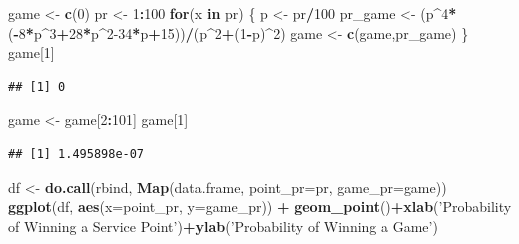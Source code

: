 \documentclass[]{article}
\newenvironment{Shaded}{\begin{snugshade}}{\end{snugshade}}
\newcommand{\ControlFlowTok}[1]{\textcolor[rgb]{0.13,0.29,0.53}{\textbf{#1}}}
\newcommand{\DataTypeTok}[1]{\textcolor[rgb]{0.13,0.29,0.53}{#1}}
\newcommand{\DecValTok}[1]{\textcolor[rgb]{0.00,0.00,0.81}{#1}}
\newcommand{\KeywordTok}[1]{\textcolor[rgb]{0.13,0.29,0.53}{\textbf{#1}}}
\newcommand{\NormalTok}[1]{#1}
\newcommand{\OperatorTok}[1]{\textcolor[rgb]{0.81,0.36,0.00}{\textbf{#1}}}
\newcommand{\StringTok}[1]{\textcolor[rgb]{0.31,0.60,0.02}{#1}}
\begin{document}
\begin{Shaded}
\begin{Highlighting}[]
\NormalTok{game <-}\StringTok{ }\KeywordTok{c}\NormalTok{(}\DecValTok{0}\NormalTok{)}
\NormalTok{pr <-}\StringTok{ }\DecValTok{1}\OperatorTok{:}\DecValTok{100}
\ControlFlowTok{for}\NormalTok{(x }\ControlFlowTok{in}\NormalTok{ pr) \{}
\NormalTok{  p <-}\StringTok{ }\NormalTok{pr}\OperatorTok{/}\DecValTok{100}
\NormalTok{  pr_game <-}\StringTok{ }\NormalTok{(p}\OperatorTok{^}\DecValTok{4}\OperatorTok{*}\NormalTok{(}\OperatorTok{-}\DecValTok{8}\OperatorTok{*}\NormalTok{p}\OperatorTok{^}\DecValTok{3}\OperatorTok{+}\DecValTok{28}\OperatorTok{*}\NormalTok{p}\OperatorTok{^}\DecValTok{2-34}\OperatorTok{*}\NormalTok{p}\OperatorTok{+}\DecValTok{15}\NormalTok{))}\OperatorTok{/}\NormalTok{(p}\OperatorTok{^}\DecValTok{2}\OperatorTok{+}\NormalTok{(}\DecValTok{1}\OperatorTok{-}\NormalTok{p)}\OperatorTok{^}\DecValTok{2}\NormalTok{)}
\NormalTok{  game <-}\StringTok{ }\KeywordTok{c}\NormalTok{(game,pr_game)}
\NormalTok{\}}
\NormalTok{game[}\DecValTok{1}\NormalTok{]}
\end{Highlighting}
\end{Shaded}

\begin{verbatim}
## [1] 0
\end{verbatim}

\begin{Shaded}
\begin{Highlighting}[]
\NormalTok{game <-}\StringTok{ }\NormalTok{game[}\DecValTok{2}\OperatorTok{:}\DecValTok{101}\NormalTok{]}
\NormalTok{game[}\DecValTok{1}\NormalTok{]}
\end{Highlighting}
\end{Shaded}

\begin{verbatim}
## [1] 1.495898e-07
\end{verbatim}

\begin{Shaded}
\begin{Highlighting}[]
\NormalTok{df <-}\StringTok{ }\KeywordTok{do.call}\NormalTok{(rbind, }\KeywordTok{Map}\NormalTok{(data.frame, }\DataTypeTok{point_pr=}\NormalTok{pr, }\DataTypeTok{game_pr=}\NormalTok{game))}
\KeywordTok{ggplot}\NormalTok{(df, }\KeywordTok{aes}\NormalTok{(}\DataTypeTok{x=}\NormalTok{point_pr, }\DataTypeTok{y=}\NormalTok{game_pr)) }\OperatorTok{+}
\StringTok{  }\KeywordTok{geom_point}\NormalTok{()}\OperatorTok{+}\KeywordTok{xlab}\NormalTok{(}\StringTok{'Probability of Winning a Service Point'}\NormalTok{)}\OperatorTok{+}\KeywordTok{ylab}\NormalTok{(}\StringTok{'Probability of Winning a Game'}\NormalTok{)}
\end{Highlighting}
\end{Shaded}
\end{document}

